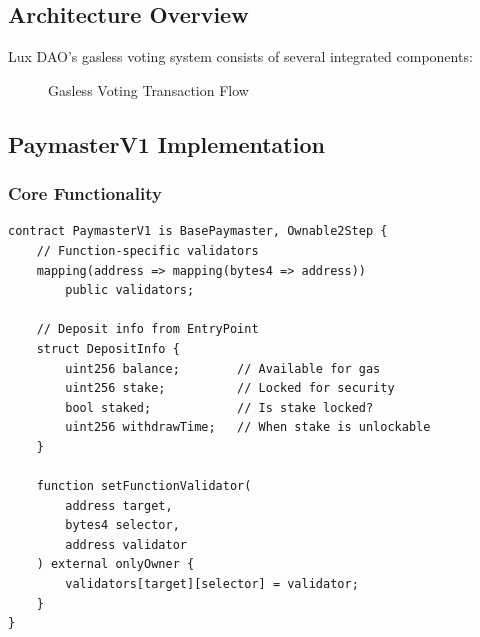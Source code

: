 \documentclass[11pt,a4paper]{article}
\begin{document}
\subsection{Architecture Overview}

Lux DAO's gasless voting system consists of several integrated components:

\begin{figure}[h]
\centering
{}
\caption{Gasless Voting Transaction Flow}
\end{figure}

\subsection{PaymasterV1 Implementation}

\subsubsection{Core Functionality}

\begin{lstlisting}[caption=Paymaster Core Structure]
contract PaymasterV1 is BasePaymaster, Ownable2Step {
    // Function-specific validators
    mapping(address => mapping(bytes4 => address))
        public validators;

    // Deposit info from EntryPoint
    struct DepositInfo {
        uint256 balance;        // Available for gas
        uint256 stake;          // Locked for security
        bool staked;            // Is stake locked?
        uint256 withdrawTime;   // When stake is unlockable
    }

    function setFunctionValidator(
        address target,
        bytes4 selector,
        address validator
    ) external onlyOwner {
        validators[target][selector] = validator;
    }
}
\end{lstlisting}
\end{document}
